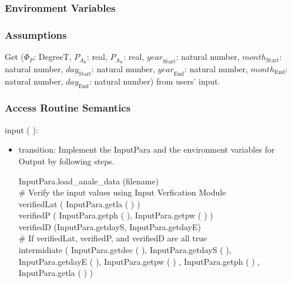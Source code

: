 \documentclass[12pt, titlepage]{article}
\begin{document}
\subsubsection{Environment Variables}


\subsubsection{Assumptions}
Get ($\Phi_P$: DegreeT, $P_{A_{\text{h}}}$: real, $P_{A_{\text{w}}}$: real, $\mathit{year}_\text{Start}$: natural number, $\mathit{month}_\text{Start}$: natural number, $\mathit{day}_\text{Start}$: natural number, $\mathit{year}_\text{End}$: natural number, $\mathit{month}_\text{End}$: natural number, $\mathit{day}_\text{End}$: natural number) from users' input.\\

\subsubsection{ Access Routine Semantics}

\noindent  input ( ):

\begin{itemize}
\item transition: Implement the InputPara and  the environment variables for Output by following steps.


InputPara.load\_anale\_data (filename)\\


$\#$ Verify the input values using Input Verfication Module\\
verifiedLat ( InputPara.getla ( ) )\\
verifiedP ( InputPara.getph ( ), InputPara.getpw ( ) )\\
verifiedD (InputPara.getdayS, InputPara.getdayE)\\

$\#$ If verifiedLat, verifiedP, and verifiedD are all true\\
intermidiate ( InputPara.getdec ( ), InputPara.getdayS ( ), InputPara.getdayE ( ), InputPara.getpw ( ) , InputPara.getph ( ) , InputPara.getla ( ) )

\end{itemize}
\end{document}
